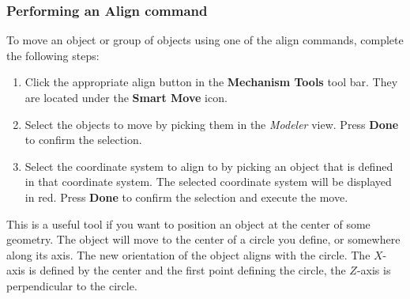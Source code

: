 
\subsubsection{Performing an Align command}

To move an object or group of objects using one of the align commands,
complete the following steps:

\begin{enumerate}
\item
  Click the appropriate align button in the \textbf{Mechanism Tools} tool bar.
  They are located under the \textbf{Smart Move} icon.

\item
  Select the objects to move by picking them in the {\sl Modeler} view.
  Press \textbf{Done} to confirm the selection.


\item
  Select the coordinate system to align to by picking an object that is defined
  in that coordinate system.
  The selected coordinate system will be displayed in red.
  Press \textbf{Done} to confirm the selection and execute the move.

\end{enumerate}



This is a useful tool if you want to position an object at the center of some
geometry. The object will move to the center of a circle you define,
or somewhere along its axis. The new orientation of the object aligns with
the circle. The $X$-axis is defined by the center and the first point defining
the circle, the $Z$-axis is perpendicular to the circle.


